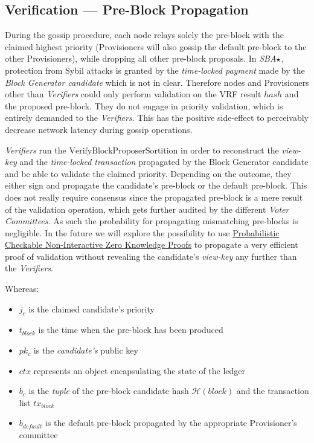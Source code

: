 \subsection{Verification --- Pre-Block Propagation}

During the gossip procedure, each node relays solely the pre-block with
the claimed highest priority (Provisioners will also gossip the default
pre-block to the other Provisioners), while dropping all other pre-block
proposals. In \emph{SBA}\(\large\star\), protection from Sybil attacks
is granted by the \emph{time-locked payment} made by the \emph{Block
Generator candidate} which is not in clear. Therefore nodes and
Provisioners other than \emph{Verifiers} could only perform validation
on the VRF result \(hash\) and the proposed pre-block. They do not
engage in priority validation, which is entirely demanded to the
\emph{Verifiers}. This has the positive side-effect to perceivably
decrease network latency during gossip operations.

\emph{Verifiers} run the \(\textrm{VerifyBlockProposerSortition}\) in
order to reconstruct the \emph{view-key} and the \emph{time-locked
transaction} propagated by the Block Generator candidate and be able to
validate the claimed priority. Depending on the outcome, they either
sign and propagate the candidate's pre-block or the default pre-block.
This does not really require consensus since the propagated pre-block is
a mere result of the validation operation, which gets further audited by
the different \emph{Voter Committees}. As such the probability for
propagating mismatching pre-blocks is negligible. In the future we will
explore the possibility to use
\href{https://www.iacr.org/archive/asiacrypt2010/6477343/6477343.pdf}{Probabilistic
Checkable Non-Interactive Zero Knowledge Proofs} to propagate a very
efficient proof of validation without revealing the candidate's
\emph{view-key} any further than the \emph{Verifiers}.

Whereas:

\begin{itemize}
\item
  \(j_c\) is the claimed candidate's priority
\item
  \(t_{block}\) is the time when the pre-block has been produced
\item
  \(pk_c\) is the \emph{candidate's} public key
\item
  \(ctx\) represents an object encapsulating the state of the ledger
\item
  \(b_{c}\) is the \emph{tuple} of the pre-block candidate hash
  \(\mathcal{H}(block)\) and the transaction list \(tx_{block}\)
\item
  \(b_{default}\) is the default pre-block propagated by the appropriate
  Provisioner's committee
\end{itemize}

